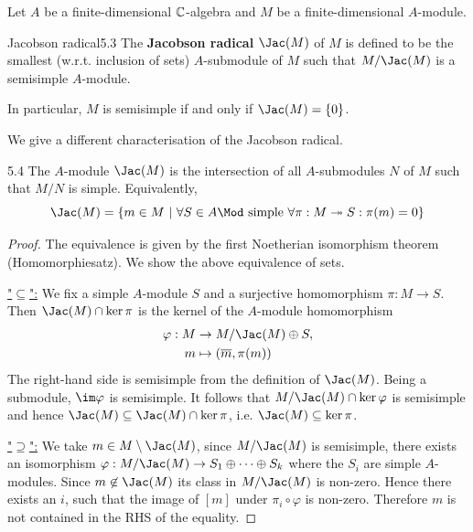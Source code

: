\documentclass[twoside = false,	%
		headsepline,		%
		parskip = true,
		]{scrbook}						%
\begin{document}
    Let $A$ be a finite-dimensional $\mathbb C$-algebra and $M$ be a finite-dimensional $A$-module.

    \begin{definition}{Jacobson radical}{5.3}
        The \textbf{Jacobson radical} $\Jac(M)$ of $M$ is defined to be the smallest (w.r.t. inclusion of sets) $A$-submodule of $M$ such that $M/\Jac(M)$ is a semisimple $A$-module.
    \end{definition}

    In particular, $M$ is semisimple if and only if $\Jac(M) = \{0\}$.

    We give a different characterisation of the Jacobson radical.

    \begin{proposition}{}{5.4}
        The $A$-module $\Jac(M)$ is the intersection of all $A$-submodules $N$ of $M$ such that $M/N$ is simple. Equivalently,
        \begin{equation*}
            \Jac(M) = \{ m \in M \ |  \ \forall S \in A\Mod \text{ simple } \forall \pi: M \twoheadrightarrow S: \pi(m) = 0\}
        \end{equation*}
    \end{proposition}

    \begin{proof}
        The equivalence is given by the first Noetherian isomorphism theorem (Homomorphiesatz). We show the above equivalence of sets.
        
        \underline{"$\subseteq$":}
            We fix a simple $A$-module $S$ and a surjective homomorphism $\pi: M \to S$. Then $\Jac(M) \cap \ker \pi$ is the kernel of the $A$-module homomorphism
            \begin{equation*}
            \begin{split}
                \varphi: M &\to M/\Jac(M) \oplus S, \\
                m &\mapsto (\overline{m}, \pi(m))
            \end{split}
            \end{equation*}
            The right-hand side is semisimple from the definition of $\Jac(M)$. Being a submodule, $\im \varphi$ is semisimple. It follows that $M/\Jac(M) \cap \ker \varphi$ is semisimple and hence $\Jac(M) \subseteq \Jac(M) \cap \ker \pi$, i.e. $\Jac(M) \subseteq \ker \pi$.

        \underline{"$\supseteq$":}
            We take $m \in M \setminus \Jac(M)$, since $M/\Jac(M)$ is semisimple, there exists an isomorphism $\varphi: M/\Jac(M) \to S_1 \oplus \dots \oplus S_k$ where the $S_i$ are simple $A$-modules. Since $m \not \in  \Jac(M)$ its class in $M/\Jac(M)$ is non-zero. Hence there exists an $i$, such that the image of $[m]$ under $\pi_i \circ \varphi$ is non-zero. Therefore $m$ is not contained in the RHS of the equality.
    \end{proof}
\end{document}
